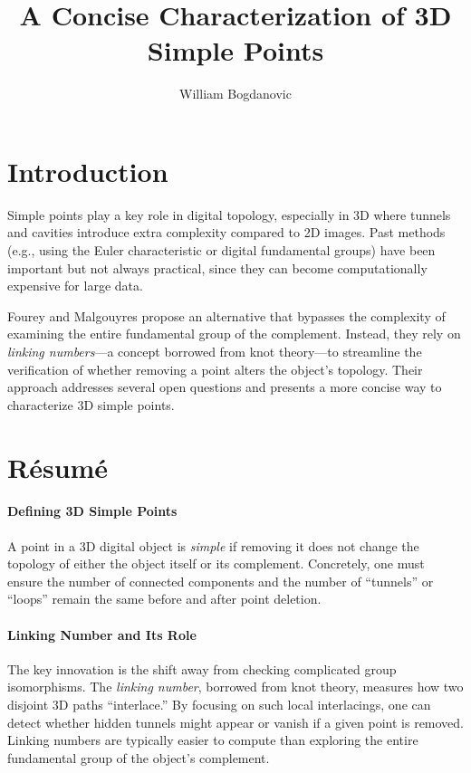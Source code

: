 \documentclass{llncs}
\begin{document}
\title{A Concise Characterization of 3D Simple Points}
\author{William Bogdanovic}
\maketitle

\section*{Introduction}

Simple points play a key role in digital topology, especially in 3D where tunnels and cavities introduce extra complexity compared to 2D images. Past methods (e.g., using the Euler characteristic or digital fundamental groups) have been important but not always practical, since they can become computationally expensive for large data. 

Fourey and Malgouyres propose an alternative that bypasses the complexity of examining the entire fundamental group of the complement. Instead, they rely on \emph{linking numbers}—a concept borrowed from knot theory—to streamline the verification of whether removing a point alters the object’s topology. Their approach addresses several open questions and presents a more concise way to characterize 3D simple points.

\section*{Résumé}

\paragraph{Defining 3D Simple Points}
A point in a 3D digital object is \emph{simple} if removing it does not change the topology of either the object itself or its complement. Concretely, one must ensure the number of connected components and the number of “tunnels” or “loops” remain the same before and after point deletion.

\paragraph{Linking Number and Its Role}
The key innovation is the shift away from checking complicated group isomorphisms. The \emph{linking number}, borrowed from knot theory, measures how two disjoint 3D paths “interlace.” By focusing on such local interlacings, one can detect whether hidden tunnels might appear or vanish if a given point is removed. Linking numbers are typically easier to compute than exploring the entire fundamental group of the object’s complement.
\end{document}
